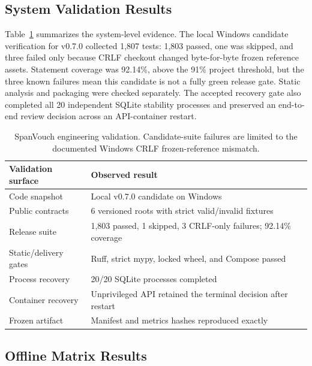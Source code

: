 \subsection{System Validation Results}

Table~\ref{tab:system-results} summarizes the system-level evidence. The local
Windows candidate verification for v0.7.0 collected 1,807 tests: 1,803 passed,
one was skipped, and three failed only because CRLF checkout changed
byte-for-byte frozen reference assets. Statement coverage was 92.14\%, above
the 91\% project threshold, but the three known failures mean this candidate is
not a fully green release gate. Static analysis and packaging were checked
separately. The accepted recovery gate also completed all 20 independent SQLite
stability processes and preserved an end-to-end review decision across an
API-container restart.

\begin{table}[t]
    \caption{SpanVouch engineering validation. Candidate-suite failures are
    limited to the documented Windows CRLF frozen-reference mismatch.}
    \label{tab:system-results}
    \centering
    \small
    \begin{tabular}{@{}p{}p{}@{}}
        \toprule
        Validation surface & Observed result \\
        \midrule
        Code snapshot & Local v0.7.0 candidate on Windows \\
        Public contracts & 6 versioned roots with strict valid/invalid fixtures \\
        Release suite & 1,803 passed, 1 skipped, 3 CRLF-only failures; 92.14\% coverage \\
        Static/delivery gates & Ruff, strict mypy, locked wheel, and Compose passed \\
        Process recovery & 20/20 SQLite processes completed \\
        Container recovery & Unprivileged API retained the terminal decision after restart \\
        Frozen artifact & Manifest and metrics hashes reproduced exactly \\
        \bottomrule
    \end{tabular}
\end{table}

\subsection{Offline Matrix Results}

